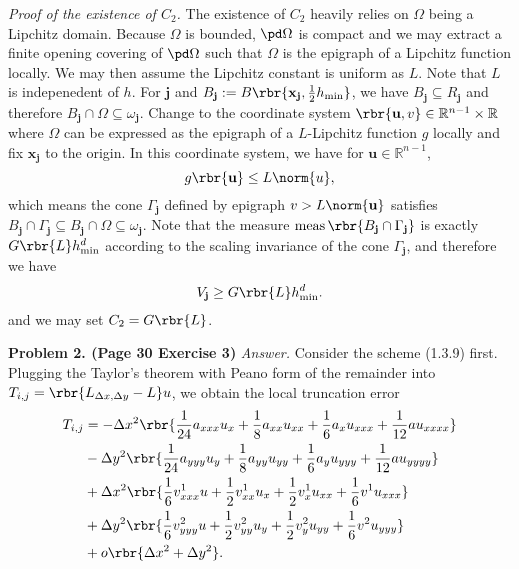 \documentclass[english, nochinese]{pnote}
\begin{document}
\textit{Proof of the existence of $C_2$.} The existence of $C_2$ heavily relies on $\Omega$ being a Lipchitz domain. Because $\Omega$ is bounded, $ \pd \Omega $ is compact and we may extract a finite opening covering of $ \pd \Omega $ such that $\Omega$ is the epigraph of a Lipchitz function locally. We may then assume the Lipchitz constant is uniform as $L$. Note that $L$ is indepenedent of $h$. For $\mathbf{j}$ and $ B_{\mathbf{j}} := B \rbr{ \mathbf{x}_{\mathbf{j}}, \frac{1}{2} h_{\text{min}} } $, we have $ B_{\mathbf{j}} \subseteq R_{\mathbf{j}} $ and therefore $ B_{\mathbf{j}} \cap \Omega \subseteq \omega_{\mathbf{j}} $. Change to the coordinate system $ \rbr{ \mathbf{u}, v } \in \mathbb{R}^{ n - 1 } \times \mathbb{R} $ where $\Omega$ can be expressed as the epigraph of a $L$-Lipchitz function $g$ locally and fix $\mathbf{x}_{\mathbf{j}}$ to the origin. In this coordinate system, we have for $ \mathbf{u} \in \mathbb{R}^{ n - 1 } $,
\begin{equation}
g \rbr{\mathbf{u}} \le L \norm{u},
\end{equation}
which means the cone $\Gamma_{\mathbf{j}}$ defined by epigraph $ v > L \norm{\mathbf{u}} $ satisfies $ B_{\mathbf{j}} \cap \Gamma_{\mathbf{j}} \subseteq B_{\mathbf{j}} \cap \Omega \subseteq \omega_{\mathbf{j}} $. Note that the measure $ \mathop{\text{meas}} \rbr{ B_{\mathbf{j}} \cap \Gamma_{\mathbf{j}} } $ is exactly $ G \rbr{L} h_{\text{min}}^d $ according to the scaling invariance of the cone $\Gamma_{\mathbf{j}}$, and therefore we have
\begin{equation}
V_{\mathbf{j}} \ge G \rbr{L} h_{\text{min}}^d.
\end{equation}
and we may set $ C_2 = G \rbr{L} $.

\textbf{Problem 2. (Page 30 Exercise 3)} \textit{Answer.} Consider the scheme (1.3.9) first. Plugging the Taylor's theorem with Peano form of the remainder into $ T_{ i, j } = \rbr{ L_{ \Delta x, \Delta y } - L } u $, we obtain the local truncation error 
\begin{equation}
\begin{split}
T_{ i, j } &= - \Delta x^2 \rbr{ \frac{1}{24} a_{ x x x } u_x + \frac{1}{8} a_{ x x } u_{ x x } + \frac{1}{6} a_x u_{ x x x } + \frac{1}{12} a u_{ x x x x } } \\
&- \Delta y^2 \rbr{ \frac{1}{24} a_{ y y y } u_y + \frac{1}{8} a_{ y y } u_{ y y } + \frac{1}{6} a_y u_{ y y y } + \frac{1}{12} a u_{ y y y y } } \\
&+ \Delta x^2 \rbr{ \frac{1}{6} v^1_{ x x x } u + \frac{1}{2} v^1_{ x x } u_x + \frac{1}{2} v^1_x u_{ x x } + \frac{1}{6} v^1 u_{ x x x } } \\
&+ \Delta y^2 \rbr{ \frac{1}{6} v^2_{ y y y } u + \frac{1}{2} v^2_{ y y } u_y + \frac{1}{2} v^2_y u_{ y y } + \frac{1}{6} v^2 u_{ y y y } } \\
&+ o \rbr{ \Delta x^2 + \Delta y^2 }.
\end{split}
\end{equation}
\end{document}
